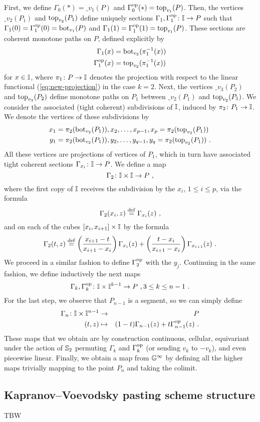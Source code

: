 First, we define $\Gamma_0 (*) = \bm_{v_1}(P)$ and $\Gamma_0^{\mathrm{op}} (*) = \operatorname{top}_{v_1}(P)$.
Then, the vertices $\bm_{v_2}(P_1)$ and $\operatorname{top}_{v_2}(P_1)$ define uniquely sections $\Gamma_1, \Gamma_1^{\mathrm{op}} \colon \mathbb{I} \to P$ such that $\Gamma_1(0)=\Gamma_1^{\mathrm{op}}(0)=\operatorname{bot}_{v_1}(P)$ and $\Gamma_1(1)=\Gamma_1^{\mathrm{op}}(1)=\operatorname{top}_{v_1}(P)$.
These sections are coherent monotone paths on $P$, defined explicitly by
\begin{align*}
	\Gamma_1(x) & = \operatorname{bot}_{v_2}(\pi_1^{-1}(x)) \\
	\Gamma_1^{\mathrm{op}}(x) & = \operatorname{top}_{v_2}(\pi_1^{-1}(x))
\end{align*}
for $x \in \mathbb{I}$, where $\pi_1 \colon P \to \mathbb{I}$ denotes the projection with respect to the linear functional (\ref{eq:new-projection}) in the case $k=2$.
Next, the vertices $\bm_{v_3}(P_2)$ and $\operatorname{top}_{v_3}(P_2)$ define monotone paths on $P_1$ between $\bm_{v_2}(P_1)$ and $\operatorname{top}_{v_2}(P_1)$.
We consider the associated (tight coherent) subdivisions of $\mathbb{I}$, induced by $\pi_2 \colon P_1 \to \mathbb{I}$.
We denote the vertices of these subdivisions by
\begin{align*}
	x_1 & = \pi_2(\operatorname{bot}_{v_2}(P_1)), x_2, \ldots, x_{p-1}, x_p=\pi_2(\operatorname{top}_{v_2}(P_1)) \\
	y_1 & = \pi_2(\operatorname{bot}_{v_2}(P_1)), y_2, \ldots, y_{q-1}, y_q=\pi_2(\operatorname{top}_{v_2}(P_1)) \ .
\end{align*}
All these vertices are projections of vertices of $P_1$, which in turn have associated tight coherent sections $\Gamma_{x_i} \colon \mathbb{I} \to P$.
We define a map
\[
\Gamma_2 \colon \mathbb{I} \times \mathbb{I} \to P \ ,
\]
where the first copy of $\mathbb{I}$ receives the subdivision by the $x_i$, $1\leq i \leq p$, via the formula
\[
\Gamma_2(x_i, z) \stackrel{\mathrm{def}}{=} \Gamma_{x_i}(z) \ ,
\]
and on each of the cubes $[x_i,x_{i+1}] \times \mathbb{I}$ by the formula
\[
\Gamma_2(t,z) \stackrel{\mathrm{def}}{=} \left( \frac{x_{i+1}-t}{x_{i+1}-x_i} \right) \Gamma_{x_i}(z) + \left( \frac{t-x_i}{x_{i+1}-x_i} \right) \Gamma_{x_{i+1}}(z) \ .
\]
We proceed in a similar fashion to define $\Gamma_2^{\mathrm{op}}$ with the $y_j$.
Continuing in the same fashion, we define inductively the next maps
\[
\Gamma_k, \Gamma_k^{\mathrm{op}} \colon \mathbb{I} \times \mathbb{I}^{k-1} \to P \ , 3 \leq k \leq n-1 \ .
\]
For the last step, we observe that $P_{n-1}$ is a segment, so we can simply define
\begin{eqnarray*}
	\Gamma_n \colon \mathbb{I} \times \mathbb{I}^{n-1} & \to & P \\
	(t,z) & \mapsto & (1-t)\Gamma_{n-1}(z) + t \Gamma_{n-1}^{\mathrm{op}} (z) \ .
\end{eqnarray*}
These maps that we obtain are by construction continuous, cellular, equivariant under the action of $\mathbb{S}_2$ permuting $\Gamma_k$ and $\Gamma_k^{\mathrm{op}}$ (or sending $v_k$ to $-v_k$), and even piecewise linear.
Finally, we obtain a map from $\mathbb{G}^\infty$ by defining all the higher maps trivially mapping to the point $P_n$ and taking the colimit.

\subsection{Kapranov--Voevodsky pasting scheme structure}

TBW